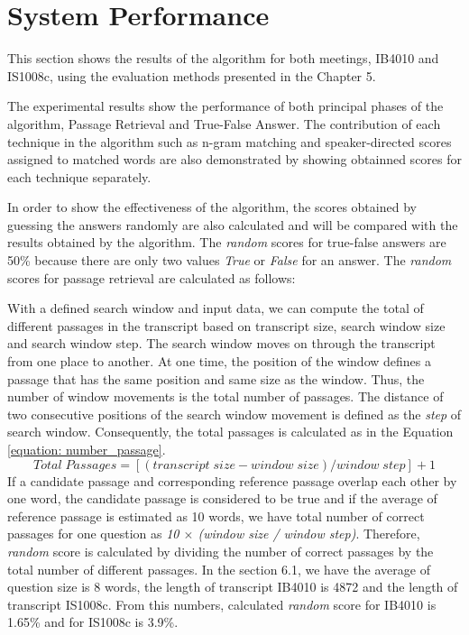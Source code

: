 \section{System Performance}


This section shows the results of the algorithm for both meetings, IB4010 and IS1008c, using the evaluation methods presented in the Chapter 5.

The experimental results show the performance of both principal phases of the algorithm, Passage Retrieval and True-False Answer. The contribution of each technique in the algorithm such as n-gram matching and speaker-directed scores assigned to matched words are also demonstrated by showing obtainned scores for each technique separately. 

In order to show the effectiveness of the algorithm, the scores obtained by guessing the answers randomly are also calculated and will be compared with the results obtained by the algorithm. The \textit{random} scores for true-false answers are 50\% because there are only two values \textit{True} or \textit{False} for an answer. The \textit{random} scores for passage retrieval are calculated as follows:

With a defined search window and input data, we can compute the total of different passages in the transcript based on transcript size, search window size and search window step. The search window moves on through the transcript from one place to another. At one time, the position of the window defines a passage that has the same position and same size as the window. Thus, the number of window movements is the total number of passages. The distance of two consecutive positions of the search window movement is defined as the \textit{step} of search window. Consequently, the total passages is calculated as in the Equation \ref{equation: number_passage}.
  \begin{equation}
\label{equation: number_passage}
	Total \; Passages = [(transcript \; size - window \; size)/window \; step] + 1
\end{equation}
   If a candidate passage and corresponding reference passage overlap each other by one word, the candidate passage is considered to be true and if the average of reference passage is estimated as 10 words, we have total number of correct passages for one question as \textit{10 \ensuremath{\times} (window size / window step)}. Therefore, \textit{random} score is calculated by dividing the number of correct passages by the total number of different passages. In the section 6.1, we have the average of question size is 8 words, the length of transcript IB4010 is 4872 and the length of transcript IS1008c. From this numbers, calculated \textit{random} score for IB4010 is 1.65\% and for IS1008c is 3.9\%.

